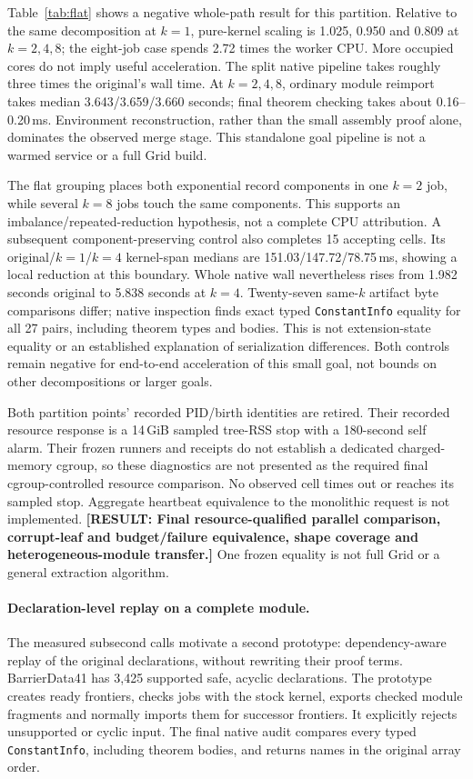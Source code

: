 \documentclass[10pt,twocolumn]{article}
\newcommand{\missing}[1]{\textbf{[RESULT: #1]}}
\begin{document}
Table~\ref{tab:flat} shows a negative whole-path result for this partition.
Relative to the same decomposition at $k=1$, pure-kernel scaling is
1.025, 0.950 and 0.809 at $k=2,4,8$; the eight-job case spends 2.72 times
the worker CPU. More occupied cores do not imply useful acceleration.
The split native pipeline takes roughly three times the original's wall time.
At $k=2,4,8$, ordinary module reimport takes median
3.643/3.659/3.660 seconds; final theorem checking takes about 0.16--0.20\,ms.
Environment reconstruction, rather than the small assembly proof alone,
dominates the observed merge stage.
This standalone goal pipeline is not a warmed service or a full Grid build.

The flat grouping places both exponential record components in one $k=2$
job, while several $k=8$ jobs touch the same components.
This supports an imbalance/repeated-reduction hypothesis, not a complete
CPU attribution. A subsequent component-preserving control also completes
15 accepting cells.
Its original/$k=1$/$k=4$ kernel-span medians are
151.03/147.72/78.75\,ms, showing a local reduction at this boundary.
Whole native wall nevertheless rises from 1.982 seconds original to
5.838 seconds at $k=4$.
Twenty-seven same-$k$ artifact byte comparisons differ; native inspection
finds exact typed \texttt{ConstantInfo} equality for all 27 pairs,
including theorem types and bodies. This is not extension-state equality
or an established explanation of serialization differences.
Both controls remain negative for end-to-end acceleration of this small goal,
not bounds on other decompositions or larger goals.

Both partition points' recorded PID/birth identities are retired.
Their recorded resource response is a 14\,GiB sampled tree-RSS stop with a
180-second self alarm. Their frozen runners and receipts do not establish a
dedicated charged-memory cgroup, so these diagnostics are not presented as
the required final cgroup-controlled resource comparison.
No observed cell times out or reaches its sampled stop.
Aggregate heartbeat equivalence to the monolithic request is not implemented.
\missing{Final resource-qualified parallel comparison, corrupt-leaf and
budget/failure equivalence, shape coverage and heterogeneous-module transfer.}
One frozen equality is not full Grid or a general extraction algorithm.

\paragraph{Declaration-level replay on a complete module.}
The measured subsecond calls motivate a second prototype: dependency-aware
replay of the original declarations, without rewriting their proof terms.
BarrierData41 has 3,425 supported safe, acyclic declarations.
The prototype creates ready frontiers, checks jobs with the stock kernel,
exports checked module fragments and normally imports them for successor
frontiers. It explicitly rejects unsupported or cyclic input.
The final native audit compares every typed \texttt{ConstantInfo}, including
theorem bodies, and returns names in the original array order.
\end{document}
